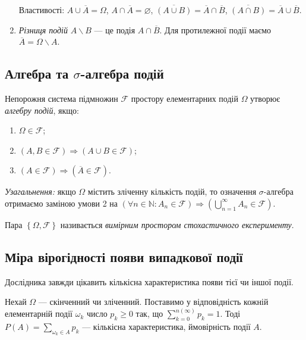 \begin{enumerate}
    Властивості: $A \cup \overline{A} = \Omega$, $A \cap \overline{A} = \varnothing$, $\overline{\left( A \cup B \right)} = \overline{A} \cap \overline{B}$,
    $\overline{\left( A \cap B \right)} = \overline{A} \cup \overline{B}$.
    \item \emph{Різниця подій} $A \backslash B$ --- це подія $A \cap \overline{B}$. Для протилежної події маємо $\overline{A} =  \Omega \backslash A$.
\end{enumerate}

\subsection*{Алгебра та $\sigma$-алгебра подій}
\begin{definition}
    Непорожня система підмножин $\mathcal{F}$ простору елементарних подій $\Omega$ утворює \emph{алгебру подій}, якщо:
    \begin{enumerate}
        \item $\Omega \in \mathcal{F}$;
        \item $\left( A, B \in \mathcal{F}\right) \Rightarrow \left( A \cup B \in \mathcal{F}\right)$;
        \item $\left( A \in \mathcal{F}\right) \Rightarrow \left( \overline{A} \in \mathcal{F}\right)$.
    \end{enumerate}
    \emph{Узагальнення:} якщо $\Omega$ містить зліченну кількість подій, то означення $\sigma$-алгебра отримаємо заміною умови
    2 на $\left(\forall n \in \mathbb{N}: A_n \in \mathcal{F} \right) \Rightarrow \left( \bigcup_{n=1}^{\infty} A_n \in \mathcal{F}\right)$.
    
    Пара $\left\{\Omega, \mathcal{F}\right\}$ називається \emph{вимірним простором стохастичного експерименту}.
\end{definition}

\subsection*{Міра вірогідності появи випадкової події}
Дослідника завжди цікавить кількісна характеристика появи тієї чи іншої події.

Нехай $\Omega$ --- скінченний чи зліченний. 
Поставимо у відповідність кожній елементарній події $\omega_k$ число $p_k\geq 0$ так, що $\sum_{k=0}^{ n \left( \infty\right)}p_k = 1$.
Тоді $P(A) = \sum_{\omega_k \in A} p_k$ --- кількісна характеристика, ймовірність події $A$.

